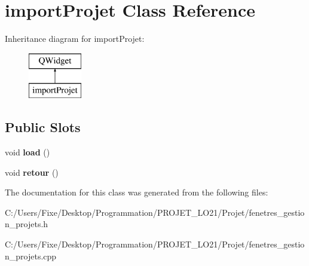 \hypertarget{classimport_projet}{}\section{import\+Projet Class Reference}
\label{classimport_projet}
Inheritance diagram for import\+Projet\+:\begin{figure}[H]
\begin{center}
\leavevmode
\includegraphics[height=2.000000cm]{classimport_projet}
\end{center}
\end{figure}
\subsection*{Public Slots}
\begin{DoxyCompactItemize}
\item 
\hypertarget{classimport_projet_a549ea825b957a5c0f0f3c1399e0570e7}{}void {\bfseries load} ()\label{classimport_projet_a549ea825b957a5c0f0f3c1399e0570e7}

\item 
\hypertarget{classimport_projet_a9059baaf93b73a4e15e2543a5e585dd2}{}void {\bfseries retour} ()\label{classimport_projet_a9059baaf93b73a4e15e2543a5e585dd2}

\end{DoxyCompactItemize}


The documentation for this class was generated from the following files\+:\begin{DoxyCompactItemize}
\item 
C\+:/\+Users/\+Fixe/\+Desktop/\+Programmation/\+P\+R\+O\+J\+E\+T\+\_\+\+L\+O21/\+Projet/fenetres\+\_\+gestion\+\_\+projets.\+h\item 
C\+:/\+Users/\+Fixe/\+Desktop/\+Programmation/\+P\+R\+O\+J\+E\+T\+\_\+\+L\+O21/\+Projet/fenetres\+\_\+gestion\+\_\+projets.\+cpp\end{DoxyCompactItemize}
